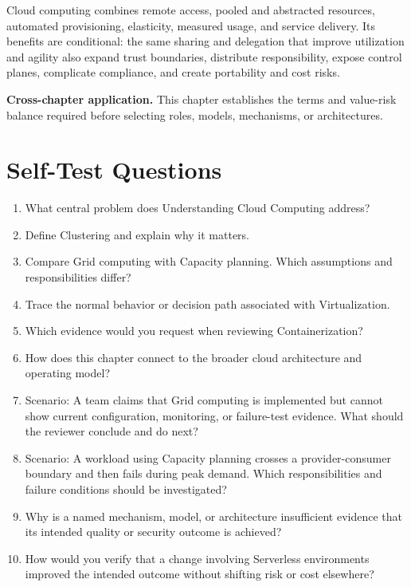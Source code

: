 \documentclass[11pt]{article}
\begin{document}
\begin{synthesisbox}
Cloud computing combines remote access, pooled and abstracted resources, automated provisioning, elasticity, measured usage, and service delivery. Its benefits are conditional: the same sharing and delegation that improve utilization and agility also expand trust boundaries, distribute responsibility, expose control planes, complicate compliance, and create portability and cost risks.
\par\smallskip
\textbf{Cross-chapter application.} This chapter establishes the terms and value-risk balance required before selecting roles, models, mechanisms, or architectures.
\end{synthesisbox}
\section{Self-Test Questions}
\begin{enumerate}
\item What central problem does Understanding Cloud Computing address?
\item Define Clustering and explain why it matters.
\item Compare Grid computing with Capacity planning. Which assumptions and responsibilities differ?
\item Trace the normal behavior or decision path associated with Virtualization.
\item Which evidence would you request when reviewing Containerization?
\item How does this chapter connect to the broader cloud architecture and operating model?
\item Scenario: A team claims that Grid computing is implemented but cannot show current configuration, monitoring, or failure-test evidence. What should the reviewer conclude and do next?
\item Scenario: A workload using Capacity planning crosses a provider-consumer boundary and then fails during peak demand. Which responsibilities and failure conditions should be investigated?
\item Why is a named mechanism, model, or architecture insufficient evidence that its intended quality or security outcome is achieved?
\item How would you verify that a change involving Serverless environments improved the intended outcome without shifting risk or cost elsewhere?
\end{enumerate}
\clearpage
\end{document}
